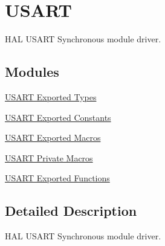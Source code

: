 \hypertarget{group___u_s_a_r_t}{}\section{U\+S\+A\+RT}
\label{group___u_s_a_r_t}


H\+AL U\+S\+A\+RT Synchronous module driver.  


\subsection*{Modules}
\begin{DoxyCompactItemize}
\item 
\hyperlink{group___u_s_a_r_t___exported___types}{U\+S\+A\+R\+T Exported Types}
\item 
\hyperlink{group___u_s_a_r_t___exported___constants}{U\+S\+A\+R\+T Exported Constants}
\item 
\hyperlink{group___u_s_a_r_t___exported___macros}{U\+S\+A\+R\+T Exported Macros}
\item 
\hyperlink{group___u_s_a_r_t___private___macros}{U\+S\+A\+R\+T Private Macros}
\item 
\hyperlink{group___u_s_a_r_t___exported___functions}{U\+S\+A\+R\+T Exported Functions}
\end{DoxyCompactItemize}


\subsection{Detailed Description}
H\+AL U\+S\+A\+RT Synchronous module driver. 

